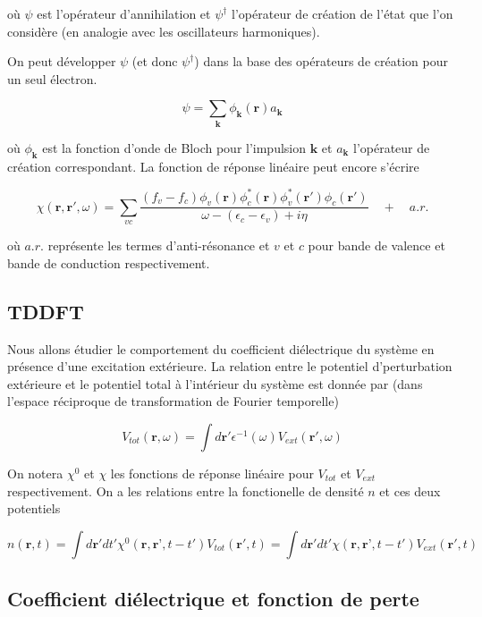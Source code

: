 \documentclass[12pt]{report}
\theoremstyle{theoreme}
\begin{document}
où $\psi$ est l'opérateur d'annihilation et $\psi^\dagger$ l'opérateur de création de l'état que l'on considère (en analogie avec les oscillateurs harmoniques).

On peut développer $\psi$ (et donc $\psi^\dagger$) dans la base des opérateurs de création
pour un seul électron.

$$
\psi = \sum_\textbf{k} \phi_\textbf{k}(\textbf{r}) a_\textbf{k}
$$

où $\phi_\textbf{k}$ est la fonction d'onde de Bloch pour l'impulsion $\textbf{k}$ et $a_\textbf{k}$ l'opérateur de création correspondant. La fonction de réponse linéaire peut encore s'écrire

\begin{equation}\label{chi}
\chi(\textbf{r}, \textbf{r}', \omega) = \sum_{vc} \frac{(f_v - f_c)\phi_v(\textbf{r}) \phi_c^*(\textbf{r}) \phi_v^*(\textbf{r}') \phi_c(\textbf{r}')}{\omega - (\epsilon_c - \epsilon_v) + i\eta} \quad + \quad a.r.
\end{equation}

où $a.r.$ représente les termes d'anti-résonance et $v$ et $c$ pour bande de valence et bande de conduction respectivement.

\subsection{TDDFT}
Nous allons étudier le comportement du coefficient diélectrique du système en présence d'une excitation extérieure. La relation entre le potentiel d'perturbation extérieure et le potentiel total à l'intérieur du système est donnée par (dans l'espace réciproque de transformation de Fourier temporelle)

$$
V_{tot}(\textbf{r}, \omega) = \int d\textbf{r}' \epsilon^{-1}(\omega) V_{ext}(\textbf{r}', \omega)
$$  

On notera $\chi^0$ et $\chi$ les fonctions de réponse linéaire pour $V_{tot}$ et $V_{ext}$ respectivement. On a les relations entre la fonctionelle de densité $n$ et ces deux potentiels

$$
n(\textbf{r}, t) = \int d\textbf{r}' dt' \chi^0(\textbf{r}, \textbf{r'}, t-t') V_{tot}(\textbf{r}', t) = \int d\textbf{r}' dt' \chi(\textbf{r}, \textbf{r'}, t-t') V_{ext}(\textbf{r}', t)
$$

\subsection{Coefficient diélectrique et fonction de perte}
\end{document}
